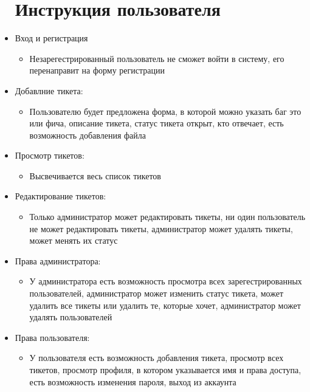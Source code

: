 \documentclass[a4paper,14pt]{extarticle} %
\begin{document}
\begin{itemize}
\section{Инструкция пользователя}
\item{Вход и регистрация}
\begin{itemize}
    \item{Незарегестрированный пользователь не сможет войти в систему, его перенаправит на форму регистрации}
\end{itemize}
\item{Добавлние тикета:} 
\begin{itemize} 
\item{Пользователю будет предложена форма, в которой можно указать баг это или фича, описание тикета, статус тикета открыт, кто отвечает, есть возможность добавления файла} 
\end{itemize}
\item{Просмотр тикетов:}
\begin{itemize}
\item{Высвечивается весь список тикетов}
\end{itemize}
\item{Редактирование тикетов:}
\begin{itemize}
\item{Только администратор может редактировать тикеты, ни один пользователь не может редактировать тикеты, администратор может удалять тикеты, может менять их статус} 
\end{itemize}
\item{Права администратора:}
\begin{itemize}
\item{У администратора есть возможность просмотра всех зарегестрированных пользователей, администратор может изменить статус тикета, может удалить все тикеты или удалить те, которые хочет, администратор может удалять пользователей}
\end{itemize}
\item{Права пользователя:}
\begin{itemize}
\item{У пользователя есть возможность добавления тикета, просмотр всех тикетов, просмотр профиля, в котором указывается имя и права доступа, есть возможность изменения пароля, выход из аккаунта}
\end{itemize}
\end{itemize}
\end{document}
